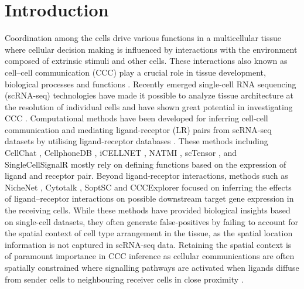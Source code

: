 \section*{Introduction}
Coordination among the cells drive various functions in a multicellular tissue where cellular decision making is influenced by interactions with the environment composed of extrinsic stimuli and other cells. These interactions also known as cell–cell communication (CCC) play a crucial role in tissue development, biological processes and functions \citep{Armingol2021}. Recently emerged single-cell RNA sequencing (scRNA-seq) technologies have made it possible to analyze tissue architecture at the resolution of individual cells \citep{Svensson2018,scDREAMER} and have shown great potential in investigating CCC \citep{Camp2017}. Computational methods have been developed for inferring cell-cell communication and mediating ligand-receptor (LR) pairs from scRNA-seq datasets by utilising ligand-receptor databases \citep{Efremova2020, Jin2021}. These methods including CellChat \citep{Jin2021}, CellphoneDB \citep{Efremova2020}, iCELLNET \citep{Noel2021}, NATMI \citep{Hou2020}, scTensor \citep{ALMET202112}, and SingleCellSignalR \citep{10.1093/nar/gkaa183} mostly rely on defining functions based on the expression of ligand and receptor pair. Beyond ligand-receptor interactions, methods such as NicheNet \citep{Browaeys2020}, Cytotalk \citep{Dimitrov2022}, SoptSC \citep{10.1093/nar/gkz204} and CCCExplorer \citep{CHOI20151187} focused on inferring the effects of ligand–receptor interactions on possible downstream target gene expression in the receiving cells. While these methods have provided biological insights based on single-cell datasets, they often generate false-positives by failing to account for the spatial context of cell type arrangement in the tissue, as the spatial location information is not captured in scRNA-seq data. Retaining the spatial context is of paramount importance in CCC inference as cellular communications are often spatially constrained where signalling pathways are activated when ligands diffuse from sender cells to neighbouring receiver cells in close proximity \citep{ALMET202112}. \par 

